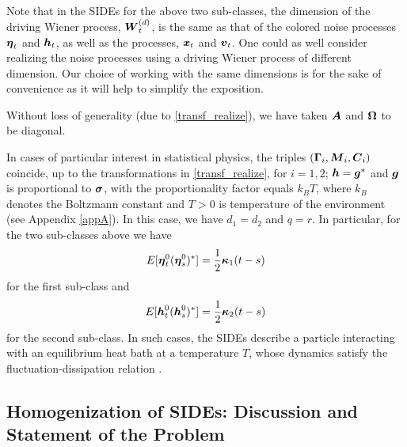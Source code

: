 \begin{remark} \label{dimofnoise} Note that in the SIDEs for the above two sub-classes, the dimension of the driving Wiener process, $\boldsymbol{W}_t^{(d)}$, is the same as that of the colored noise processes $\boldsymbol{\eta}_t$ and $\boldsymbol{h}_t$, as well as the processes, $\boldsymbol{x}_t$ and $\boldsymbol{v}_t$. One could as well consider realizing the noise processes using a driving Wiener process of different dimension. Our choice of working with the same dimensions is for the sake of convenience as it will help to simplify the exposition. 
\end{remark}

\begin{remark}
Without loss of generality (due to \eqref{transf_realize}), we have taken $\boldsymbol{A}$ and $\boldsymbol{\Omega}$ to be diagonal.  
\end{remark}


\begin{remark}
In cases of particular interest in statistical physics, the triples $(\boldsymbol{\Gamma}_i, \boldsymbol{M}_i, \boldsymbol{C}_i)$ coincide, up to the transformations in \eqref{transf_realize}, for $i=1,2$; $\boldsymbol{h} = \boldsymbol{g}^*$ and $\boldsymbol{g}$ is proportional to $\boldsymbol{\sigma}$, with the proportionality factor equals $k_B T$, where $k_B$ denotes the Boltzmann constant and $T > 0$ is temperature of the environment (see Appendix \ref{appA}). In this case, we have $d_1=d_2$ and $q=r$.  In particular, for the two sub-classes above we have
\begin{equation} \label{fdt_sc1}
E[\boldsymbol{\eta}_{t}^{0} (\boldsymbol{\eta}_{s}^{0})^{*}] = \frac{1}{2} \boldsymbol{\kappa}_1(t-s)
\end{equation}
for the first sub-class and 
\begin{equation}
E[\boldsymbol{h}_{t}^{0} (\boldsymbol{h}_{s}^{0})^{*}] = \frac{1}{2} \boldsymbol{\kappa}_{2}(t-s)
\end{equation}
for the second sub-class. 
In such cases, the SIDEs describe a particle interacting with an equilibrium heat bath at a temperature $T$, whose dynamics satisfy the fluctuation-dissipation relation \cite{toda2012statistical,zwanzig2001nonequilibrium}.
\end{remark}

\subsection{Homogenization of SIDEs: Discussion and  Statement of the Problem} \label{nmleB}


